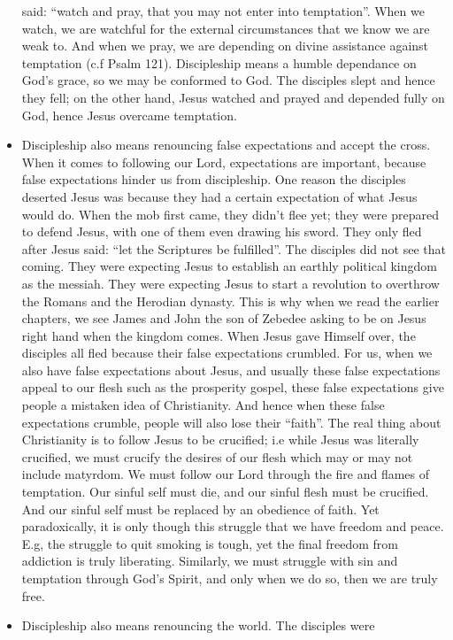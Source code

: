 \begin{itemize}
{  said: ``watch and pray, that you may not enter into temptation''.  When we
  watch, we are watchful for the external circumstances that we know we are
  weak to.  And when we pray, we are depending on divine assistance against
  temptation (c.f Psalm 121).  Discipleship means a humble dependance on
  God's grace, so we may be conformed to God.  The disciples slept and hence
  they fell; on the other hand, Jesus watched and prayed and depended fully
  on God, hence Jesus overcame temptation.}
  \item{Discipleship also means renouncing false expectations and accept the
  cross.  When it comes to following our Lord, expectations are important,
  because false expectations hinder us from discipleship.  One reason the
  disciples deserted Jesus was because they had a certain expectation of what
  Jesus would do.  When the mob first came, they didn't flee yet; they were
  prepared to defend Jesus, with one of them even drawing his sword.  They
  only fled after Jesus said: ``let the Scriptures be fulfilled''.  The
  disciples did not see that coming.  They were expecting Jesus to establish
  an earthly political kingdom as the messiah.  They were expecting Jesus to
  start a revolution to overthrow the Romans and the Herodian dynasty.  This
  is why when we read the earlier chapters, we see James and John the son of
  Zebedee asking to be on Jesus right hand when the kingdom comes.  When
  Jesus gave Himself over, the disciples all fled because their false
  expectations crumbled.  For us, when we also have false expectations about
  Jesus, and usually these false expectations appeal to our flesh such as the
  prosperity gospel, these false expectations give people a mistaken idea of
  Christianity.  And hence when these false expectations crumble, people will
  also lose their ``faith''.  The real thing about Christianity is to follow
  Jesus to be crucified; i.e while Jesus was literally crucified, we must
  crucify the desires of our flesh which may or may not include matyrdom.  We
  must follow our Lord through the fire and flames of temptation.  Our sinful
  self must die, and our sinful flesh must be crucified.  And our sinful self
  must be replaced by an obedience of faith.  Yet paradoxically, it is only
  though this struggle that we have freedom and peace.  E.g, the struggle to
  quit smoking is tough, yet the final freedom from addiction is truly
  liberating.  Similarly, we must struggle with sin and temptation through
  God's Spirit, and only when we do so, then we are truly free.}
  \item{Discipleship also means renouncing the world.  The disciples were
}
\end{itemize}
